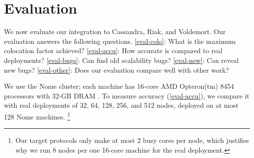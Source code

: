 

\section{Evaluation}
\label{sec-sck-eval}


We now evaluate our \sck integration to Cassandra, Riak,
and Voldemort.  Our evaluation answers the following questions.
%
\sec\ref{eval-colo}: What is the maximum colocation factor achieved?
%
\sec\ref{eval-accu}: How accurate is \sck compared to real deployments?
%
\sec\ref{eval-bugs}: Can \sck find old scalability bugs?
%
\sec\ref{eval-new}: Can \sck reveal new bugs?
%
%
\sec\ref{eval-other}: Does our evaluation compare well with other work?


We use the Nome cluster; each machine has 16-core AMD Opteron(tm) 8454
processors with 32-GB DRAM \cite{NomeNodes}.
%
To measure \sck accuracy (\sec\ref{eval-accu}), we compare it with real
deployments of 32, 64, 128, 256, and 512 nodes, deployed on at most 128 Nome
machines.  
%
\footnote{Our target protocols only make at most 2 busy cores per
node, which justifies why we run 8 nodes per one 16-core machine for the real
deployment. }
%







